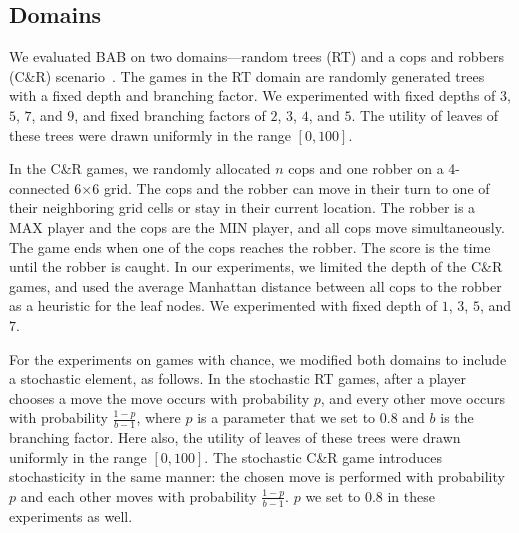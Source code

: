 \documentclass[runningheads]{llncs}
\newcounter{bab}
\newcommand{\pess}{\mathit{L}}
\newcommand{\opti}{\mathit{U}}
\newcommand{\vmax}{v_{\text{max}}}
\newcommand{\vmin}{v_{\text{min}}}
\newcommand{\amb}{\mathit{AMB}}
\newcommand{\er}{\mathit{ER}}
\begin{document}



\subsection{Domains}
We evaluated BAB on two domains---random trees (RT) and a cops and robbers (C\&R) scenario~\citep{moldenhauer2009evaluating}. The games in the RT domain are randomly generated trees with a fixed depth and branching factor. We experimented with 
fixed depths of $3$, $5$, $7$, and $9$, and fixed branching factors of $2$, $3$, $4$, and $5$. 
The utility of leaves of these trees were drawn uniformly in the range $[0, 100]$. 

In the C\&R games, we randomly allocated $n$ cops and one robber on a 4-connected 6$\times$6 grid. The cops and the robber can move in their turn to one of their neighboring grid cells or stay in their current location. The robber is a MAX player and the cops are the MIN player, and all cops move simultaneously. The game ends when one of the cops reaches the robber. The score is the time until the robber is caught. 
In our experiments, we limited the depth of the C\&R games, and used the average Manhattan distance between all cops to the robber as a heuristic for the leaf nodes. We experimented with fixed depth of $1$, $3$, $5$, and $7$.


For the experiments on games with chance, we modified both domains to include a stochastic element, as follows. In the stochastic RT games, after a player chooses a move the move occurs with probability $p$, and every other move occurs with probability $\frac{1-p}{b-1}$, where $p$ is a parameter that we set to $0.8$ and $b$ is the branching factor. Here also, the utility of leaves of these trees were drawn uniformly in the range $[0, 100]$. %
The stochastic C\&R game introduces stochasticity in the same manner: the chosen move is performed with probability $p$ and each other moves with probability $\frac{1-p}{b-1}$. $p$ we set to 0.8 in these experiments as well. 
\end{document}
